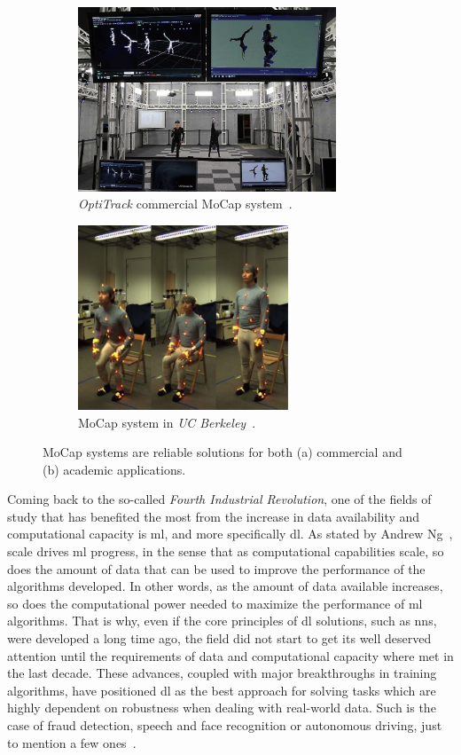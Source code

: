 \begin{figure}[h]\centering
    \begin{subfigure}{0.49\textwidth}\centering
        \includegraphics[height=5.5cm]{figures/optitrack.jpg} 
        \caption{\emph{OptiTrack} commercial MoCap system~\cite{optitrack_2019}.}
        \label{subfig:optitrack}
    \end{subfigure}
    \begin{subfigure}{0.49\textwidth}\centering
        \includegraphics[height=5.5cm]{figures/bmhad_example.JPG}
        \caption{MoCap system in \emph{UC Berkeley}~\cite{ofli2013berkeley}.}
        \label{subfig:berkeley}
    \end{subfigure}
    \caption{MoCap systems are reliable solutions for both (a) commercial and (b) academic applications.}
    \label{fig:mocap}
\end{figure}

Coming back to the so-called \emph{Fourth Industrial Revolution}, one of the fields of study that has benefited the most from the increase in data availability and computational capacity is \gls{ml}, and more specifically \gls{dl}. As stated by Andrew Ng~\cite{ng2016nuts}, scale drives \gls{ml} progress, in the sense that as computational capabilities scale, so does the amount of data that can be used to improve the performance of the algorithms developed. In other words, as the amount of data available increases, so does the computational power needed to maximize the performance of \gls{ml} algorithms. That is why, even if the core principles of \gls{dl} solutions, such as \glspl{nn}, were developed a long time ago, the field did not start to get its well deserved attention until the requirements of data and computational capacity where met in the last decade. These advances, coupled with major breakthroughs in training algorithms, have positioned \gls{dl} as the best approach for solving tasks which are highly dependent on robustness when dealing with real-world data. Such is the case of fraud detection, speech and face recognition or autonomous driving, just to mention a few ones~\cite{liu2017survey}.

